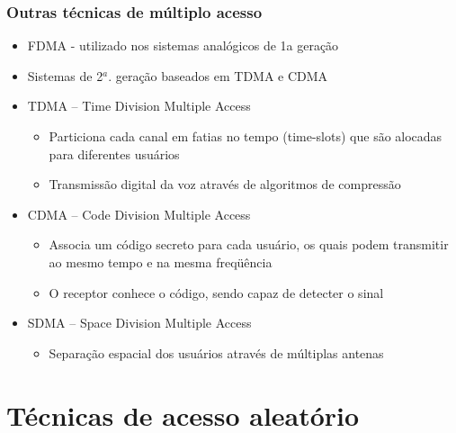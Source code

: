 \begin{frame}
 	\frametitle{Outras técnicas de múltiplo acesso}
 
	\begin{itemize}
		\item  FDMA - utilizado nos sistemas analógicos de 1a geração
		\item Sistemas de 2$^a.$ geração baseados em TDMA e CDMA
		\vspace{0.1cm}\item TDMA – Time Division Multiple Access
		\begin{itemize}
			\item Particiona cada canal em fatias no tempo (time-slots) que são alocadas para diferentes usuários
			\item Transmissão digital da voz através de algoritmos de compressão
		\end{itemize}
		\vspace{0.1cm}\item CDMA – Code Division Multiple Access
		\begin{itemize}
			\item Associa um código secreto para cada usuário, os quais podem transmitir ao mesmo tempo e na mesma freqüência
			\item O receptor conhece o código, sendo capaz de detecter o sinal
		\end{itemize}
		\vspace{0.1cm}\item SDMA – Space Division Multiple Access
		\begin{itemize}
			\item Separação espacial dos usuários através de múltiplas antenas
		\end{itemize}

	\end{itemize}
 \end{frame}

  
 \section{Técnicas de acesso aleatório}
 
